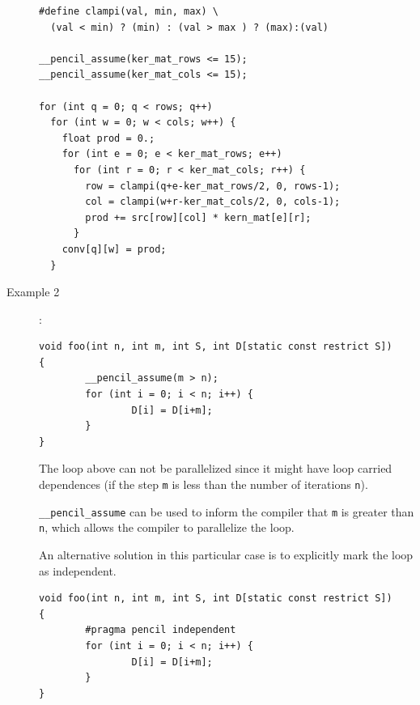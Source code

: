 \documentclass{carp}
\begin{document}
\begin{description}
\begin{lstlisting}[language=pencil]
#define clampi(val, min, max) \
  (val < min) ? (min) : (val > max ) ? (max):(val)

__pencil_assume(ker_mat_rows <= 15);
__pencil_assume(ker_mat_cols <= 15);

for (int q = 0; q < rows; q++)
  for (int w = 0; w < cols; w++) {
    float prod = 0.;
    for (int e = 0; e < ker_mat_rows; e++)
      for (int r = 0; r < ker_mat_cols; r++) {
        row = clampi(q+e-ker_mat_rows/2, 0, rows-1);
        col = clampi(w+r-ker_mat_cols/2, 0, cols-1);
        prod += src[row][col] * kern_mat[e][r];
      }
    conv[q][w] = prod;
  }
\end{lstlisting}
  
\item [{Example 2}]:
  \begin{lstlisting}[language=pencil]
void foo(int n, int m, int S, int D[static const restrict S])
{
        __pencil_assume(m > n);
        for (int i = 0; i < n; i++) {
                D[i] = D[i+m];
        }
}
  \end{lstlisting}
The loop above can not be parallelized since it might have loop
carried dependences (if the step \lstinline!m! is less than the
number of iterations \lstinline!n!).

\lstinline!__pencil_assume! can be used to inform the compiler that
\lstinline!m! is greater than \lstinline!n!, which allows the compiler
to parallelize the loop.

An alternative solution in this particular case is to explicitly
mark the loop as independent.

  \begin{lstlisting}[language=pencil]
void foo(int n, int m, int S, int D[static const restrict S])
{
        #pragma pencil independent
        for (int i = 0; i < n; i++) {
                D[i] = D[i+m];
        }
}
  \end{lstlisting}
\end{description}
\end{document}
